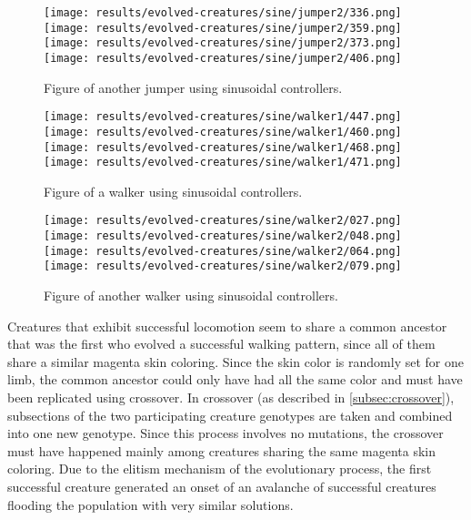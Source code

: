 \documentclass[main]{subfiles}
\begin{document}
\begin{figure}[tb]
\centering
\texttt{[image: results/evolved-creatures/sine/jumper2/336.png]}
\texttt{[image: results/evolved-creatures/sine/jumper2/359.png]}
\texttt{[image: results/evolved-creatures/sine/jumper2/373.png]}
\texttt{[image: results/evolved-creatures/sine/jumper2/406.png]}
\caption[Figure of the successful sinusoid controller creatures.]{Figure of another jumper using sinusoidal controllers.}
\label{figure:successfulcreatures-jumper2}
\end{figure}

\begin{figure}[tb]
\centering
\texttt{[image: results/evolved-creatures/sine/walker1/447.png]}
\texttt{[image: results/evolved-creatures/sine/walker1/460.png]}
\texttt{[image: results/evolved-creatures/sine/walker1/468.png]}
\texttt{[image: results/evolved-creatures/sine/walker1/471.png]}
\caption[Figure of the successful sinusoid controller creatures.]{Figure of a walker using sinusoidal controllers.}
\label{figure:successfulcreatures-walker1}
\end{figure}

\begin{figure}[tb]
\centering
\texttt{[image: results/evolved-creatures/sine/walker2/027.png]}
\texttt{[image: results/evolved-creatures/sine/walker2/048.png]}
\texttt{[image: results/evolved-creatures/sine/walker2/064.png]}
\texttt{[image: results/evolved-creatures/sine/walker2/079.png]}
\caption[Figure of the successful sinusoid controller creatures.]{Figure of another walker using sinusoidal controllers.}
\label{figure:successfulcreatures-walker2}
\end{figure}

Creatures that exhibit successful locomotion seem to share a common ancestor that was the first who evolved a successful walking pattern, since all of them share a similar magenta skin coloring. Since the skin color is randomly set for one limb, the common ancestor could only have had all the same color and must have been replicated using crossover. In crossover (as described in \ref{subsec:crossover}), subsections of the two participating creature genotypes are taken and combined into one new genotype. Since this process involves no mutations, the crossover must have happened mainly among creatures sharing the same magenta skin coloring. Due to the elitism mechanism of the evolutionary process, the first successful creature generated an onset of an avalanche of successful creatures flooding the population with very similar solutions. 
\end{document}
